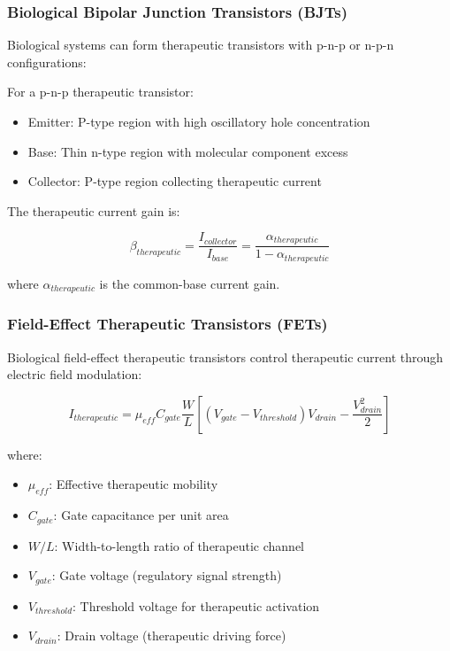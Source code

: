 \documentclass[12pt,a4paper]{article}
\begin{document}
\subsubsection{Biological Bipolar Junction Transistors (BJTs)}

Biological systems can form therapeutic transistors with p-n-p or n-p-n configurations:

For a p-n-p therapeutic transistor:
\begin{itemize}
\item Emitter: P-type region with high oscillatory hole concentration
\item Base: Thin n-type region with molecular component excess
\item Collector: P-type region collecting therapeutic current
\end{itemize}

The therapeutic current gain is:

\begin{equation}
\beta_{therapeutic} = \frac{I_{collector}}{I_{base}} = \frac{\alpha_{therapeutic}}{1 - \alpha_{therapeutic}}
\end{equation}

where $\alpha_{therapeutic}$ is the common-base current gain.

\subsubsection{Field-Effect Therapeutic Transistors (FETs)}

Biological field-effect therapeutic transistors control therapeutic current through electric field modulation:

\begin{equation}
I_{therapeutic} = \mu_{eff} C_{gate} \frac{W}{L} \left[(V_{gate} - V_{threshold})V_{drain} - \frac{V_{drain}^2}{2}\right]
\end{equation}

where:
\begin{itemize}
\item $\mu_{eff}$: Effective therapeutic mobility
\item $C_{gate}$: Gate capacitance per unit area
\item $W/L$: Width-to-length ratio of therapeutic channel
\item $V_{gate}$: Gate voltage (regulatory signal strength)
\item $V_{threshold}$: Threshold voltage for therapeutic activation
\item $V_{drain}$: Drain voltage (therapeutic driving force)
\end{itemize}
\end{document}
